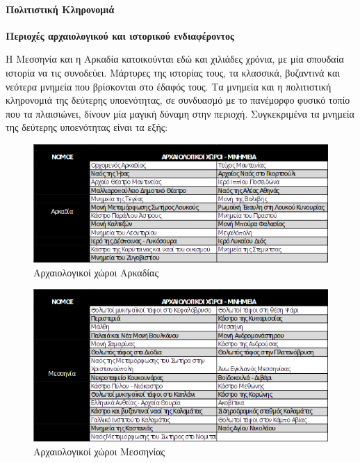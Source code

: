 \documentclass[12pt]{article}
\begin{document}
	\paragraph{Πολιτιστική Κληρονομιά}
	
	\textbf{Περιοχές αρχαιολογικού και ιστορικού ενδιαφέροντος}
	
	Η Μεσσηνία και η Αρκαδία κατοικούνται εδώ και χιλιάδες χρόνια, με μία σπουδαία ιστορία να τις συνοδεύει. Μάρτυρες της ιστορίας τους, τα κλασσικά, βυζαντινά και νεότερα μνημεία που βρίσκονται στο έδαφός τους. Τα μνημεία και η πολιτιστική κληρονομιά της δεύτερης υποενότητας, σε συνδυασμό με το πανέμορφο φυσικό τοπίο που τα πλαισιώνει, δίνουν μία μαγική δύναμη στην περιοχή. Συγκεκριμένα τα μνημεία της δεύτερης υποενότητας είναι τα εξής:
	
	\begin{figure} [H]
		\begin{center}
			\includegraphics [scale = 0.80] {mnimia1.png}
			\caption{Αρχαιολογικοί χώροι Αρκαδίας}
		\end{center}
	\end{figure}

	\begin{figure} [H]
		\begin{center}
			\includegraphics [scale = 0.80] {mnimia2.png}
			\caption{Αρχαιολογικοί χώροι Μεσσηνίας}
		\end{center}
	\end{figure}
\end{document}
